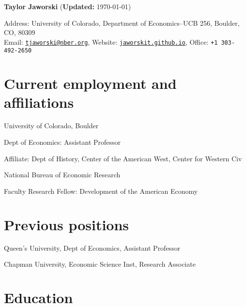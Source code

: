 \documentclass[11pt,letterpaper]{article}
\begin{document}
\textbf{\LARGE Taylor Jaworski} {\scriptsize(\textbf{Updated:} \today) }


{ Address: University of Colorado, Department of Economics--UCB 256, Boulder, CO, 80309} \vspace{.25em} \\ 
{ Email: \href{tjaworski@nber.org}{\color{black} \tt tjaworski@nber.org}, Website: 
\href{https://jaworskit.github.io/}{\color{black} \tt jaworskit.github.io}, Office:
{\color{black}\tt +1 303-492-2650}}

\vspace{-1em}
\section*{Current employment and affiliations}

\begin{description}[leftmargin=.75in,itemsep=.25em,itemindent=0in]
	\item[2017 - ] University of Colorado, Boulder
	\item[]			\hspace{.1in}Dept of Economics: Assistant Professor
	\item[]			\hspace{.1in}Affiliate: Dept of History, Center of the American West, Center for Western Civ
	\item[2016 - ]	National Bureau of Economic Research
	\item[]			\hspace{.1in}Faculty Research Fellow: Development of the American Economy
\end{description}

\vspace{-1em}
\section*{Previous positions}

\begin{description}[leftmargin=.75in,itemsep=.25em,itemindent=0in]
	\item[2014 - 17] 	Queen's University, Dept of Economics, Assistant Professor
	\item[2008 - 09] 	Chapman University, Economic Science Inst, Research Associate
\end{description}

\vspace{-1em}
\section*{Education}
\end{document}
